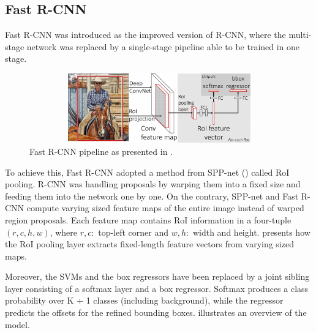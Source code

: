 \subsection{Fast R-CNN}
Fast R-CNN was introduced as the improved version of R-CNN, where the multi-stage network was replaced by a single-stage pipeline able to be trained in one stage.

\begin{figure}[!htb]
  \centering
  \includegraphics[width=12cm, height=3cm]{figures/ch2/fig3.png}
  \caption{Fast R-CNN pipeline as presented in \cite{girshick2015fast}.}
  \label{ch2:fig3}
\end{figure}

To achieve this, Fast R-CNN adopted a method from SPP-net (\cite{he2015spatial}) called RoI pooling. R-CNN was handling proposals by warping them into a fixed size and feeding them into the network one by one. On the contrary, SPP-net and Fast R-CNN compute varying sized feature maps of the entire image instead of warped region proposals. Each feature map contains RoI information in a four-tuple $(r,c,h,w)$, where $r, c:$ top-left corner and $w, h:$ width and height.  presents how the RoI pooling layer extracts fixed-length feature vectors from varying sized maps.

Moreover, the SVMs and the box regressors have been replaced by a joint sibling layer consisting of a softmax layer and a box regressor. Softmax produces a class probability over K + 1 classes (including background), while the regressor predicts the offsets for the refined bounding boxes.  illustrates an overview of the model. 

